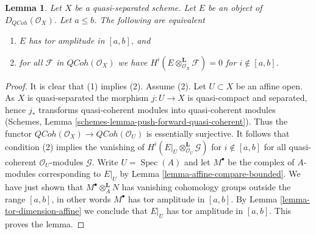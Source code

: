 \documentclass{stacks-project}
\theoremstyle{plain}
\newtheorem{lemma}[subsection]{Lemma}
\theoremstyle{definition}
\theoremstyle{remark}
\numberwithin{equation}{subsection}
\def\Spec{\mathop{\mathrm{Spec}}}
\def\QCoh{\mathit{QCoh}}
\begin{document}
\begin{lemma}
\label{lemma-tor-qc-qs}
Let $X$ be a quasi-separated scheme. Let $E$ be an object
of $D_\QCoh(\mathcal{O}_X)$. Let $a \leq b$. The
following are equivalent
\begin{enumerate}
\item $E$ has tor amplitude in $[a, b]$, and
\item for all $\mathcal{F}$ in $\QCoh(\mathcal{O}_X)$
we have $H^i(E \otimes_{\mathcal{O}_X}^\mathbf{L} \mathcal{F}) = 0$
for $i \not \in [a, b]$.
\end{enumerate}
\end{lemma}

\begin{proof}
It is clear that (1) implies (2). Assume (2). Let $U \subset X$ be
an affine open. As $X$ is quasi-separated the morphism $j : U \to X$
is quasi-compact and separated, hence $j_*$ transforms quasi-coherent
modules into quasi-coherent modules
(Schemes, Lemma \ref{schemes-lemma-push-forward-quasi-coherent}).
Thus the functor
$\QCoh(\mathcal{O}_X) \to \QCoh(\mathcal{O}_U)$
is essentially surjective. It follows that condition (2)
implies the vanishing of
$H^i(E|_U \otimes_{\mathcal{O}_U}^\mathbf{L} \mathcal{G})$
for $i \not \in [a, b]$ for all quasi-coherent $\mathcal{O}_U$-modules
$\mathcal{G}$. Write $U = \Spec(A)$ and let $M^\bullet$ be the
complex of $A$-modules corresponding to $E|_U$ by
Lemma \ref{lemma-affine-compare-bounded}.
We have just shown that $M^\bullet \otimes_A^\mathbf{L} N$
has vanishing cohomology groups outside the range $[a, b]$,
in other words $M^\bullet$ has tor amplitude in $[a, b]$.
By Lemma \ref{lemma-tor-dimension-affine}
we conclude that $E|_U$ has tor amplitude in $[a, b]$.
This proves the lemma.
\end{proof}
\end{document}
